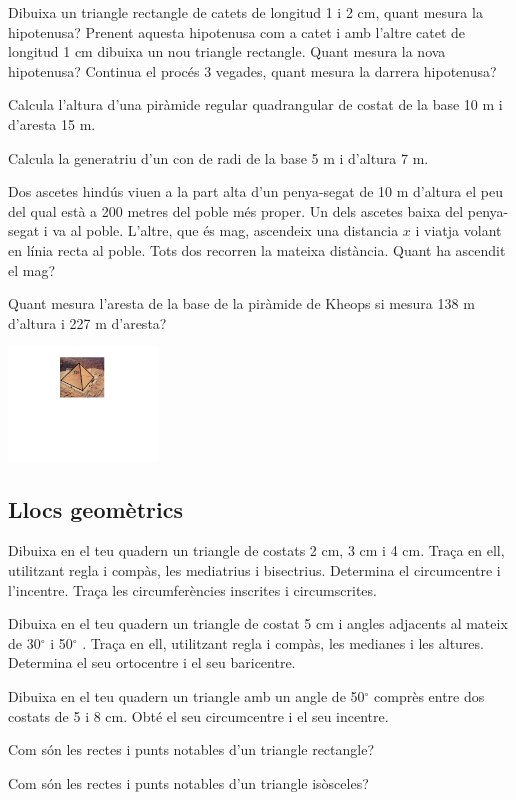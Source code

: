 \begin{activitats}
\begin{mylist}
\exer  Dibuixa un triangle rectangle de catets de longitud 1 i 2 cm, quant mesura la hipotenusa? Prenent aquesta hipotenusa com a catet i amb l'altre catet de longitud 1 cm dibuixa un nou triangle rectangle. Quant mesura la nova hipotenusa? Continua el procés 3 vegades, quant mesura la darrera hipotenusa?

\exer  Calcula l'altura d'una piràmide regular quadrangular de costat de la base 10 m i d'aresta 15 m.

\exer  Calcula la generatriu d'un con de radi de la base 5 m i d'altura 7 m.

\exer  Dos ascetes hindús viuen a la part alta d'un penya-segat de 10 m d'altura el peu del qual està a 200 metres del poble més proper. Un dels ascetes baixa del penya-segat i va al poble. L'altre, que és mag, ascendeix una distancia $x$ i viatja volant en línia recta al poble. Tots dos recorren la mateixa distància. Quant ha ascendit el mag?

\exer  Quant mesura l'aresta de la base de la piràmide de Kheops si mesura 138 m d'altura i 227 m d'aresta?
\begin{center}
	\includegraphics[width=0.3\textwidth]{img-09/keops}
\end{center}

\end{mylist}


\subsection{Llocs geomètrics}

\begin{mylist}
	\exer  Dibuixa en el teu quadern un triangle de costats 2 cm, 3 cm i 4 cm. Traça en ell, utilitzant regla i compàs, les mediatrius i bisectrius. Determina el circumcentre i l'incentre. Traça les circumferències inscrites i circumscrites.
	
	\exer  Dibuixa en el teu quadern un triangle de costat 5 cm i angles adjacents al mateix de 30${}^\circ$  i 50${}^\circ$ . Traça en ell, utilitzant regla i compàs, les medianes i les altures. Determina el seu ortocentre i el seu baricentre.
	
	\exer  Dibuixa en el teu quadern un triangle amb un angle de 50${}^\circ$  comprès entre dos costats de 5 i 8 cm. Obté el seu circumcentre i el seu incentre.
	
	\exer  Com són les rectes i punts notables d'un triangle rectangle?
	
	\exer  Com són les rectes i punts notables d'un triangle isòsceles?


\end{mylist}
\end{activitats}

